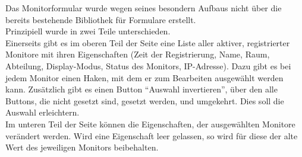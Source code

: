 Das Monitorformular wurde wegen seines besondern Aufbaus nicht über die bereits bestehende Bibliothek für Formulare erstellt.\\
Prinzipiell wurde in zwei Teile unterschieden.\\
Einerseits gibt es im oberen Teil der Seite eine Liste aller aktiver, registrierter Monitore mit ihren Eigenschaften (Zeit der Registrierung, Name, Raum, Abteilung, Display-Modus, Status des Monitors, IP-Adresse). Dazu gibt es bei jedem Monitor einen Haken, mit dem er zum Bearbeiten ausgewählt werden kann. Zusätzlich gibt es einen Button \enquote{Auswahl invertieren}, über den alle Buttons, die nicht gesetzt sind, gesetzt werden, und umgekehrt. Dies soll die Auswahl erleichtern.\\
Im unteren Teil der Seite können die Eigenschaften, der ausgewählten Monitore verändert werden. Wird eine Eigenschaft leer gelassen, so wird für diese der alte Wert des jeweiligen Monitors beibehalten.